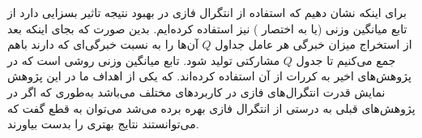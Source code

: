 برای اینکه نشان دهیم که استفاده از انتگرال فازی در بهبود نتیجه تاثیر بسزایی دارد از تابع میانگین وزنی (یا به اختصار ) نیز استفاده کرده‌ایم. بدین صورت که بجای اینکه بعد از استخراج میزان خبرگی هر عامل جداول $Q$ آن‌ها را به نسبت خبرگی‌ای که دارند باهم جمع می‌کنیم تا جدول $Q$ مشارکتی تولید شود. تابع میانگین وزنی روشی است که در پژوهش‌های اخیر به کررات از آن استفاده کرده‌اند. که یکی از اهداف ما در این پژوهش نمایش قدرت انتگرال‌های فازی در کاربرد‌های مختلف می‌باشد به‌طوری که اگر در پژوهش‌های قبلی به درستی از انتگرال فازی بهره برده می‌شد می‌توان به قطع گفت که می‌توانستند نتایج بهتری را بدست بیاورند.


